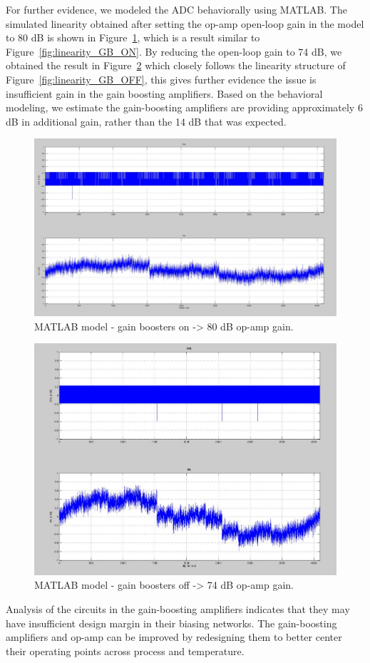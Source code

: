 For further evidence, we modeled the ADC behaviorally using MATLAB. The simulated linearity obtained after setting the op-amp open-loop gain in the model to 80 dB is shown in Figure~\ref{fig:behav_GB_ON}, which is a result similar to Figure~\ref{fig:linearity_GB_ON}. By reducing the open-loop gain to 74 dB, we obtained the result in Figure~\ref{fig:behav_GB_OFF} which closely follows the linearity structure of Figure~\ref{fig:linearity_GB_OFF}, this gives further evidence the issue is insufficient gain in the gain boosting amplifiers. Based on the behavioral modeling, we estimate the gain-boosting amplifiers are providing approximately 6 dB in additional gain, rather than the 14 dB that was expected.
\begin{figure}[h!]
\centering
  \includegraphics[width=0.7\linewidth]{figures/prakash_fig/behav_GB_ON.JPG}
  \caption{MATLAB model - gain boosters on -> 80 dB op-amp gain.}
  \label{fig:behav_GB_ON}
\end{figure}

\begin{figure}[h!]
\centering
  \includegraphics[width=0.7\linewidth]{figures/prakash_fig/behav_GB_OFF.JPG}
  \caption{MATLAB model - gain boosters off -> 74 dB op-amp gain.}
  \label{fig:behav_GB_OFF}
\end{figure}
Analysis of the circuits in the gain-boosting amplifiers indicates that they may have insufficient design margin in their biasing networks. The gain-boosting amplifiers and op-amp can be improved by redesigning them to better center their operating points across process and temperature.

